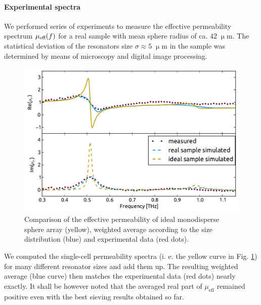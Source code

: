 \paragraph{Experimental spectra} %
We performed series of experiments to measure the effective permeability spectrum $\mu_{\text{eff} }(f)$ for a real sample with mean sphere radius of ca. $42\;\upmu$m. The statistical deviation of the resonators size $\sigma \approx 5\;\upmu$m in the sample was determined by means of microscopy and digital image processing. 

\begin{figure}[ht]  \caption{Comparison of the effective permeability of ideal monodisperse sphere array (yellow), weighted average according to the size distribution (blue) and experimental data (red dots).}
\label{fg_experimentalConv} \centering 
\includegraphics[width=12cm]{img/Spheres_FDTD_experimentalConv.pdf}
\end{figure}

We computed the single-cell permeability spectra (i. e. the yellow curve in Fig. \ref{fg_experimentalConv}) for many different resonator sizes and add them up. The resulting weighted average (blue curve) then matches the experimental data (red dots) nearly exactly. It shall be however noted that the averaged real part of $\mu_{\text{eff}}$ remained positive even with the best sieving results obtained so far. %


